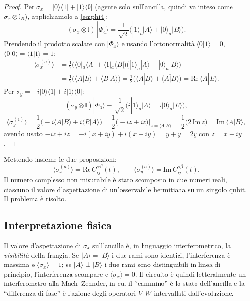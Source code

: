 \documentclass[11pt,a4paper]{article}
\begin{document}
\begin{proof}
Per $\sigma_x=|0\rangle\langle1|+|1\rangle\langle0|$ (agente solo sull'ancilla, quindi va inteso
come $\sigma_x\otimes\mathbb I_R$), applichiamolo a \eqref{eq:phi4}:
\begin{equation}
(\sigma_x\otimes\mathbb I)\,|\Phi_4\rangle=\frac{1}{\sqrt2}\Big(|1\rangle_a|A\rangle+|0\rangle_a|B\rangle\Big).
\end{equation}
Prendendo il prodotto scalare con $|\Phi_4\rangle$ e usando l'ortonormalità
$\langle0|1\rangle=0$, $\langle0|0\rangle=\langle1|1\rangle=1$:
\begin{align}
\langle\sigma_x^{(a)}\rangle
&=\frac{1}{2}\Big(\langle0|_a\langle A|+\langle1|_a\langle B|\Big)\Big(|1\rangle_a|A\rangle+|0\rangle_a|B\rangle\Big)\\
&=\frac{1}{2}\Big(\langle A|B\rangle+\langle B|A\rangle\Big)
=\frac{1}{2}\Big(\langle A|B\rangle+\overline{\langle A|B\rangle}\Big)
=\mathrm{Re}\,\langle A|B\rangle .
\end{align}
Per $\sigma_y=-i|0\rangle\langle1|+i|1\rangle\langle0|$:
\begin{equation}
(\sigma_y\otimes\mathbb I)|\Phi_4\rangle=\frac{1}{\sqrt2}\Big(i|1\rangle_a|A\rangle-i|0\rangle_a|B\rangle\Big),
\end{equation}
\begin{equation}
\langle\sigma_y^{(a)}\rangle=\frac{1}{2}\Big(-i\langle A|B\rangle+i\langle B|A\rangle\Big)
=\frac{1}{2}\Big(-i z+i\bar z\Big)\Big|_{z=\langle A|B\rangle}
=\frac{1}{2}\big(2\,\mathrm{Im}\,z\big)=\mathrm{Im}\,\langle A|B\rangle,
\end{equation}
avendo usato $-iz+i\bar z=-i(x+iy)+i(x-iy)=y+y=2y$ con $z=x+iy$.
\end{proof}

Mettendo insieme le due proposizioni:
\begin{equation}
\boxed{\;\langle\sigma_x^{(a)}\rangle=\mathrm{Re}\,C_{ij}^{\alpha\beta}(t),
\qquad
\langle\sigma_y^{(a)}\rangle=\mathrm{Im}\,C_{ij}^{\alpha\beta}(t).\;}
\end{equation}
Il numero complesso non misurabile è stato scomposto in due numeri reali, ciascuno il valore
d'aspettazione di un'osservabile hermitiana su un singolo qubit. Il problema è risolto.

\subsection{Interpretazione fisica}

Il valore d'aspettazione di $\sigma_x$ sull'ancilla è, in linguaggio interferometrico, la
\emph{visibilità} della frangia. Se $|A\rangle=|B\rangle$ i due rami sono identici,
l'interferenza è massima e $\langle\sigma_x\rangle=1$; se $|A\rangle\perp|B\rangle$ i due rami
sono distinguibili in linea di principio, l'interferenza scompare e
$\langle\sigma_x\rangle=0$. Il circuito è quindi letteralmente un interferometro alla
Mach--Zehnder, in cui il ``cammino'' è lo stato dell'ancilla e la ``differenza di fase'' è
l'azione degli operatori $V,W$ intervallati dall'evoluzione.
\end{document}
